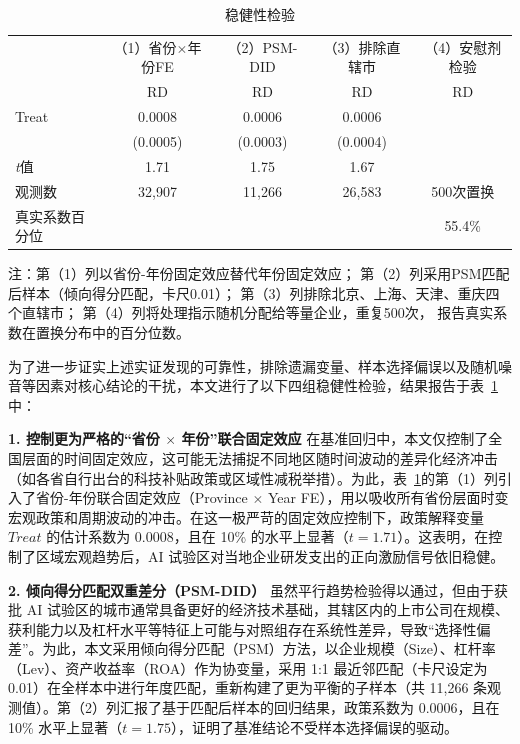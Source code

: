 \documentclass[12pt,hyperref,a4paper,UTF8]{ctexart}
\begin{document}
\begin{table}[htbp]
\centering
\caption{稳健性检验}
\label{tab:robust}
\begin{threeparttable}
\begin{tabular}{lcccc}
\toprule
 & （1）省份$\times$年份FE & （2）PSM-DID & （3）排除直辖市 & （4）安慰剂检验 \\
 & RD & RD & RD & RD \\
\midrule
Treat & 0.0008 & 0.0006 & 0.0006 & \\
      & (0.0005) & (0.0003) & (0.0004) & \\
\textit{t}值 & 1.71 & 1.75 & 1.67 & \\
观测数 & 32,907 & 11,266 & 26,583 & 500次置换 \\
\midrule
真实系数百分位 & & & & 55.4\% \\
\bottomrule
\end{tabular}
\begin{tablenotes}
\item 注：第（1）列以省份-年份固定效应替代年份固定效应；
第（2）列采用PSM匹配后样本（倾向得分匹配，卡尺0.01）；
第（3）列排除北京、上海、天津、重庆四个直辖市；
第（4）列将处理指示随机分配给等量企业，重复500次，
报告真实系数在置换分布中的百分位数。
\end{tablenotes}
\end{threeparttable}
\end{table}
为了进一步证实上述实证发现的可靠性，排除遗漏变量、样本选择偏误以及随机噪音等因素对核心结论的干扰，本文进行了以下四组稳健性检验，结果报告于表~\ref{tab:robust}中：

\textbf{1. 控制更为严格的“省份 $\times$ 年份”联合固定效应}
在基准回归中，本文仅控制了全国层面的时间固定效应，这可能无法捕捉不同地区随时间波动的差异化经济冲击（如各省自行出台的科技补贴政策或区域性减税举措）。为此，表~\ref{tab:robust}的第（1）列引入了省份-年份联合固定效应（Province $\times$ Year FE），用以吸收所有省份层面时变宏观政策和周期波动的冲击。在这一极严苛的固定效应控制下，政策解释变量 $Treat$ 的估计系数为 0.0008，且在 10\% 的水平上显著（$t = 1.71$）。这表明，在控制了区域宏观趋势后，AI 试验区对当地企业研发支出的正向激励信号依旧稳健。

\textbf{2. 倾向得分匹配双重差分（PSM-DID）}
虽然平行趋势检验得以通过，但由于获批 AI 试验区的城市通常具备更好的经济技术基础，其辖区内的上市公司在规模、获利能力以及杠杆水平等特征上可能与对照组存在系统性差异，导致“选择性偏差”。为此，本文采用倾向得分匹配（PSM）方法，以企业规模（Size）、杠杆率（Lev）、资产收益率（ROA）作为协变量，采用 1:1 最近邻匹配（卡尺设定为 0.01）在全样本中进行年度匹配，重新构建了更为平衡的子样本（共 11,266 条观测值）。第（2）列汇报了基于匹配后样本的回归结果，政策系数为 0.0006，且在 10\% 水平上显著（$t = 1.75$），证明了基准结论不受样本选择偏误的驱动。
\end{document}

